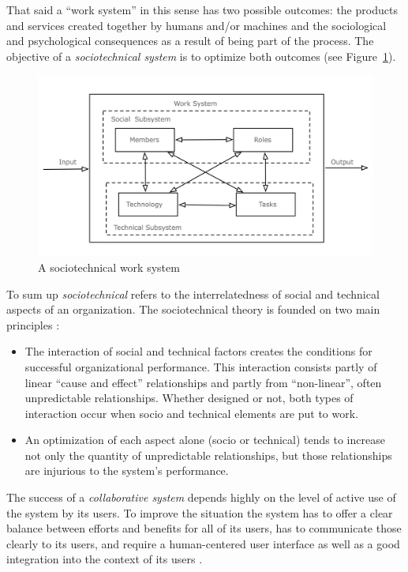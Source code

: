 That said a ``work system'' in this sense has two possible outcomes: the products and services created together by humans and/or machines and the sociological and psychological consequences as a result of being part of the process. The objective of a \emph{sociotechnical system} is to optimize both outcomes (see Figure~\ref{fig:images_sociotechnical_system}). \@

\begin{figure}[H]
  \centering
  \includegraphics[width=0.9\columnwidth]{images/sociotechnical_system.png}
  \caption[A sociotechnical work system]{A sociotechnical work system \citep{xx}}
\label{fig:images_sociotechnical_system}
\end{figure}

To sum up \emph{sociotechnical} refers to the interrelatedness of social and technical aspects of an organization. The sociotechnical theory is founded on two main principles \citep{Koch2008}: \@

\begin{itemize}
  \item The interaction of social and technical factors creates the conditions for successful organizational performance. This interaction consists partly of linear ``cause and effect'' relationships and partly from ``non-linear'', often unpredictable relationships. Whether designed or not, both types of interaction occur when socio and technical elements are put to work.
  \item An optimization of each aspect alone (socio or technical) tends to increase not only the quantity of unpredictable relationships, but those relationships are injurious to the system's performance.
\end{itemize}

The success of a \emph{collaborative system} depends highly on the level of active use of the system by its users. To improve the situation the system has to offer a clear balance between efforts and benefits for all of its users, has to communicate those clearly to its users, and require a human-centered user interface as well as a good integration into the context of its users \citep{Koch2008}.

